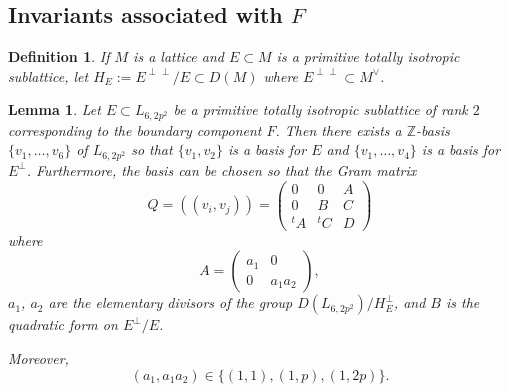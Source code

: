 \documentclass[11pt]{amsart}
\newtheorem{lem}[thm]{Lemma}
\newtheorem{defn}[thm]{Definition}
\newcommand{\ZZ}{\mathbb{Z}}
\begin{document}
\subsection{Invariants associated with $F$}
\begin{defn}
If $M$ is a lattice and $E \subset M$ is a primitive totally isotropic sublattice, let $H_E := E^{\perp \perp}/E \subset D(M)$ where $E^{\perp \perp} \subset M^{\vee}$. 
\end{defn}
\begin{lem}\label{isobasisp}
Let $E \subset L_{6,2p^2}$ be a primitive totally isotropic sublattice of rank $2$ corresponding to the boundary component $F$. 
Then there exists a $\ZZ$-basis $\{v_1, \ldots, v_6 \}$ of $L_{6,2p^2}$ so that $\{v_1, v_2\}$ is a basis for $E$ and $\{v_1, \ldots, v_4 \}$ is a basis for $E^{\perp}$. 
Furthermore, the basis can be chosen so that the Gram matrix
\begin{equation}\label{eqnform}
Q 
= 
((v_i, v_j)) 
= 
\begin{pmatrix} 
0 & 0 & A \\ 
0 & B & C \\ 
{}^tA & {}^tC & D 
\end{pmatrix}
\end{equation}
where
\begin{equation*}
A = 
\begin{pmatrix} 
a_1 & 0 \\ 
0 & a_1 a_2 
\end{pmatrix},
\end{equation*}
$a_1$, $a_2$ are the elementary divisors of the group $D(L_{6,2p^2}) / H_E^{\perp}$, and $B$ is the quadratic form on $E^{\perp} /E$.

Moreover, 
\begin{equation*}
  (a_1, a_1a_2) \in \{ (1,1), (1,p), (1,2p) \}.
\end{equation*}
\end{lem}
\end{document}
